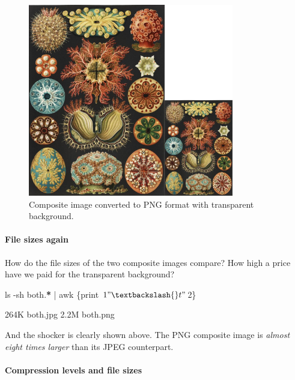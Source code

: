 \documentclass[
  11pt,
  british,
  a4paper,
]{article}
\newenvironment{Shaded}{\begin{snugshade}}{\end{snugshade}}
\newcommand{\AttributeTok}[1]{\textcolor[rgb]{0.80,0.80,0.80}{#1}}
\newcommand{\ExtensionTok}[1]{\textcolor[rgb]{0.80,0.80,0.80}{#1}}
\newcommand{\FunctionTok}[1]{\textcolor[rgb]{0.94,0.94,0.56}{#1}}
\newcommand{\KeywordTok}[1]{\textcolor[rgb]{0.94,0.87,0.69}{#1}}
\newcommand{\NormalTok}[1]{\textcolor[rgb]{0.80,0.80,0.80}{#1}}
\newcommand{\PreprocessorTok}[1]{\textcolor[rgb]{1.00,0.81,0.69}{\textbf{#1}}}
\newcommand{\StringTok}[1]{\textcolor[rgb]{0.80,0.58,0.58}{#1}}
\begin{document}
\begin{figure}
\hypertarget{fig:both-png}{%
\centering
\includegraphics[width=0.8\textwidth,height=\textheight]{images/both.png}
\caption{Composite image converted to PNG format with transparent
background.}\label{fig:both-png}
}
\end{figure}

\hypertarget{file-sizes-again}{%
\paragraph{File sizes again}\label{file-sizes-again}}

How do the file sizes of the two composite images compare? How high a
price have we paid for the transparent background?

\begin{Shaded}
\begin{Highlighting}[]
\FunctionTok{ls} \AttributeTok{{-}sh}\NormalTok{ both.}\PreprocessorTok{*} \KeywordTok{|} \FunctionTok{awk} \StringTok{\textquotesingle{}\{print $1 "\textbackslash{}t" $2\}\textquotesingle{}}

\ExtensionTok{264K}\NormalTok{    both.jpg}
\ExtensionTok{2.2M}\NormalTok{    both.png}
\end{Highlighting}
\end{Shaded}

And the shocker is clearly shown above. The PNG composite image is
\emph{almost eight times larger} than its JPEG counterpart.

\hypertarget{compression-levels-and-file-sizes}{%
\paragraph{Compression levels and file
sizes}\label{compression-levels-and-file-sizes}}
\end{document}
